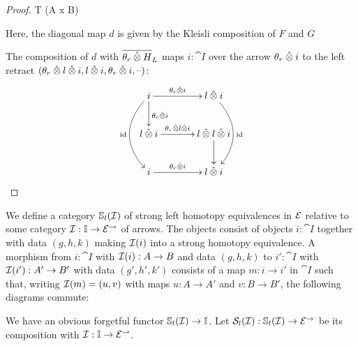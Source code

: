 \documentclass[reqno,10pt,a4paper,oneside]{amsart}
\begin{document}
\begin{proof}
T (A x B) 

Here, the diagonal map $d$ is given by the Kleisli composition of $F$ and $G$ 

The composition of $d$ with $\overline{\thetar \hatotimes H}_L$ maps $i : \cat{I}$ over the arrow $\thetar \hatotimes i$ to the left retract $(\thetar \hatotimes \intervall \hatotimes i, \intervall \hatotimes i, \thetar \hatotimes i, \mbox{--})$:
\[
\xymatrix@C+1em{
  i
  \ar[r]^-{\thetar \hatotimes i}
  \ar[d]^{\thetar \hatotimes i}
  \ar@/_2em/[dd]_{\id}
&
  \intervall \hatotimes i
  \ar@/^2em/[dd]^{\id}
\\
  \intervall \hatotimes i
  \ar[r]^-{\thetar \hatotimes \intervall \hatotimes i}
&
  \intervall \hatotimes \intervall \hatotimes i
  \ar[d]
\\
  i
  \ar[r]^-{\thetar \hatotimes i}
&
  \intervall \hatotimes i
}
\]


\end{proof}


\newcommand{\stronghe}{\cat{S}}

\begin{definition}
We define a category $\cat{S}_l(\cal{I})$ of strong left homotopy equivalences in $\catE$ relative to some category $\cal{I} : \cat{I} \to \catE^{\to}$ of arrows.
The objects consist of objects $i : \cat{I}$ together with data $(g, h, k)$ making $\cal{I}(i)$ into a strong homotopy equivalence.
A morphism from $i : \cat{I}$ with $\cal{I}(i) : A \to B$ and data $(g, h, k)$ to $i' : \cat{I}$ with $\cal{I}(i') : A' \to B'$ with data $(g', h', k')$ consists of a map $m : i \to i'$ in $\cat{I}$ such that, writing $\cal{I}(m) = (u, v)$ with maps $u : A \to A'$ and $v : B \to B'$, the following diagrams commute:

We have an obvious forgetful functor $\cat{S}_l(\cal{I}) \to \cat{I}$.
Let $\cal{S}_l(\cal{I}) : \cat{S}_l(\cal{I}) \to \catE^{\to}$ be its composition with $\cal{I} : \cat{I} \to \catE^{\to}$.
\end{definition}
\end{document}
